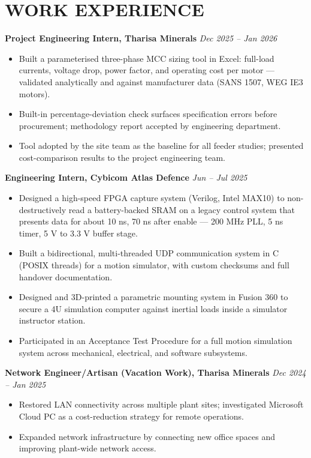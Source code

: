 \documentclass[10pt,a4paper]{article}
\newcommand{\workentry}[2]{%
  \noindent\textbf{\small #1} \hfill
  \textit{\small #2}\par
  \vspace{2pt}
}
\begin{document}
\section{WORK EXPERIENCE}

\workentry{Project Engineering Intern, Tharisa Minerals}{Dec 2025 -- Jan 2026}
\begin{itemize}
  \item Built a parameterised three-phase MCC sizing tool in Excel: full-load currents, voltage drop, power factor, and operating cost per motor --- validated analytically and against manufacturer data (SANS 1507, WEG IE3 motors).
  \item Built-in percentage-deviation check surfaces specification errors before procurement; methodology report accepted by engineering department.
  \item Tool adopted by the site team as the baseline for all feeder studies; presented cost-comparison results to the project engineering team.
\end{itemize}

\vspace{3pt}

\workentry{Engineering Intern, Cybicom Atlas Defence}{Jun -- Jul 2025}
\begin{itemize}
  \item Designed a high-speed FPGA capture system (Verilog, Intel MAX10) to non-destructively read a battery-backed SRAM on a legacy control system that presents data for about 10 ns, 70 ns after enable --- 200 MHz PLL, 5 ns timer, 5 V to 3.3 V buffer stage.
  \item Built a bidirectional, multi-threaded UDP communication system in C (POSIX threads) for a motion simulator, with custom checksums and full handover documentation.
  \item Designed and 3D-printed a parametric mounting system in Fusion 360 to secure a 4U simulation computer against inertial loads inside a simulator instructor station.
  \item Participated in an Acceptance Test Procedure for a full motion simulation system across mechanical, electrical, and software subsystems.
\end{itemize}

\vspace{3pt}

\workentry{Network Engineer/Artisan (Vacation Work), Tharisa Minerals}{Dec 2024 -- Jan 2025}
\begin{itemize}
  \item Restored LAN connectivity across multiple plant sites; investigated Microsoft Cloud PC as a cost-reduction strategy for remote operations.
  \item Expanded network infrastructure by connecting new office spaces and improving plant-wide network access.
\end{itemize}
\end{document}

